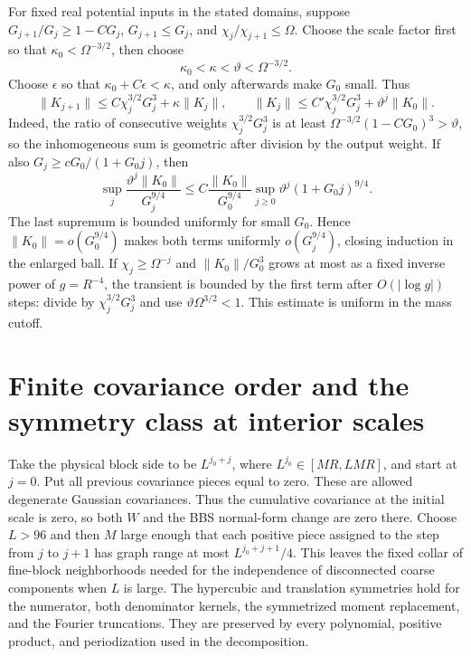\documentclass[11pt]{article}
\begin{document}
For fixed real potential inputs in the stated domains, suppose
\(G_{j+1}/G_j\ge1-CG_j\), \(G_{j+1}\le G_j\), and
\(\chi_j/\chi_{j+1}\le\Omega\).  Choose the scale factor first so
that \(\kappa_0<\Omega^{-3/2}\), then choose
\[
 \kappa_0<\kappa<\vartheta<\Omega^{-3/2}.
\]
Choose \(\epsilon\) so that \(\kappa_0+C\epsilon<\kappa\),
and only afterwards make \(G_0\) small.  Thus
\[
 \|K_{j+1}\|\le C\chi_j^{3/2}G_j^3+\kappa\|K_j\|,
 \qquad
 \|K_j\|\le C'\chi_j^{3/2}G_j^3+\vartheta^j\|K_0\|.
\]
Indeed, the ratio of consecutive weights \(\chi_j^{3/2}G_j^3\)
is at least \(\Omega^{-3/2}(1-CG_0)^3>\vartheta\), so the
inhomogeneous sum is geometric after division by the output weight.
If also \(G_j\ge cG_0/(1+G_0j)\), then
\[
 \sup_j\frac{\vartheta^j\|K_0\|}{G_j^{9/4}}
 \le C\frac{\|K_0\|}{G_0^{9/4}}
       \sup_{j\ge0}\vartheta^j(1+G_0j)^{9/4}.
\]
The last supremum is bounded uniformly for small \(G_0\).  Hence
\(\|K_0\|=o(G_0^{9/4})\) makes both terms uniformly
\(o(G_j^{9/4})\), closing induction in the enlarged ball.
If \(\chi_j\ge\Omega^{-j}\) and
\(\|K_0\|/G_0^3\) grows at most as a fixed inverse power of
\(g=R^{-4}\), the transient is bounded by the first term after
\(O(|\log g|)\) steps: divide by \(\chi_j^{3/2}G_j^3\)
and use \(\vartheta\Omega^{3/2}<1\).  This estimate is uniform
in the mass cutoff.


\section{Finite covariance order and the symmetry class at interior scales}

Take the physical block side to be \(L^{j_0+j}\), where
\(L^{j_0}\in[MR,LMR]\), and start at \(j=0\). Put all previous
covariance pieces equal to zero. These are allowed degenerate
Gaussian covariances. Thus the cumulative covariance at the initial
scale is zero, so both \(W\) and the BBS normal-form change are
zero there. Choose \(L>96\) and then \(M\) large enough that each positive piece
assigned to the step from \(j\) to \(j+1\) has graph range at
most \(L^{j_0+j+1}/4\). This leaves the fixed collar of
fine-block neighborhoods needed for the independence of
disconnected coarse components when \(L\) is large. The
hypercubic and translation symmetries
hold for the numerator, both denominator kernels, the
symmetrized moment replacement, and the Fourier truncations.
They are preserved by every polynomial, positive product, and
periodization used in the decomposition.
\end{document}
